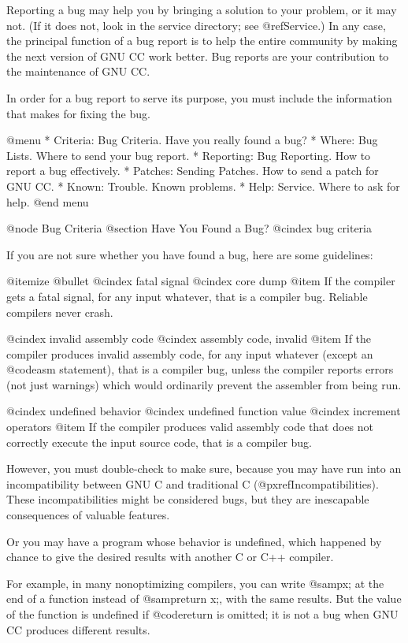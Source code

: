 Reporting a bug may help you by bringing a solution to your problem, or
it may not.  (If it does not, look in the service directory; see
@ref{Service}.)  In any case, the principal function of a bug report is
to help the entire community by making the next version of GNU CC work
better.  Bug reports are your contribution to the maintenance of GNU CC.

In order for a bug report to serve its purpose, you must include the
information that makes for fixing the bug.

@menu
* Criteria:  Bug Criteria.   Have you really found a bug?
* Where: Bug Lists.	     Where to send your bug report.
* Reporting: Bug Reporting.  How to report a bug effectively.
* Patches: Sending Patches.  How to send a patch for GNU CC.
* Known: Trouble.            Known problems.
* Help: Service.             Where to ask for help.
@end menu

@node Bug Criteria
@section Have You Found a Bug?
@cindex bug criteria

If you are not sure whether you have found a bug, here are some guidelines:

@itemize @bullet
@cindex fatal signal
@cindex core dump
@item
If the compiler gets a fatal signal, for any input whatever, that is a
compiler bug.  Reliable compilers never crash.

@cindex invalid assembly code
@cindex assembly code, invalid
@item
If the compiler produces invalid assembly code, for any input whatever
(except an @code{asm} statement), that is a compiler bug, unless the
compiler reports errors (not just warnings) which would ordinarily
prevent the assembler from being run.

@cindex undefined behavior
@cindex undefined function value
@cindex increment operators
@item
If the compiler produces valid assembly code that does not correctly
execute the input source code, that is a compiler bug.

However, you must double-check to make sure, because you may have run
into an incompatibility between GNU C and traditional C
(@pxref{Incompatibilities}).  These incompatibilities might be considered
bugs, but they are inescapable consequences of valuable features.

Or you may have a program whose behavior is undefined, which happened
by chance to give the desired results with another C or C++ compiler.

For example, in many nonoptimizing compilers, you can write @samp{x;}
at the end of a function instead of @samp{return x;}, with the same
results.  But the value of the function is undefined if @code{return}
is omitted; it is not a bug when GNU CC produces different results.

